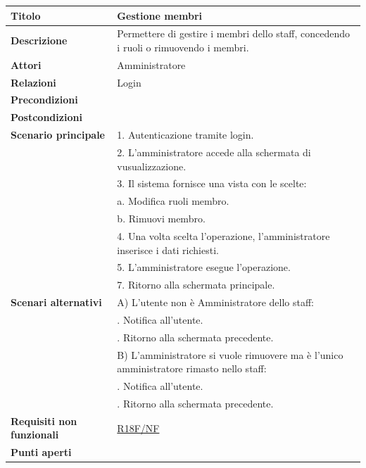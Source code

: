 \documentclass[a4paper]{article}
\begin{document}


  \begin{center}
    \begin{tabularx}{1\textwidth}{l|X}
        \textbf{Titolo} & Gestione membri \\
        \hline
        \textbf{Descrizione} & Permettere di gestire i membri dello staff, concedendo i ruoli o rimuovendo i membri. \\
        \hline
        \textbf{Attori} & Amministratore \\
        \hline
        \textbf{Relazioni} & Login \\
        \hline
        \textbf{Precondizioni} &  \\
        \hline
        \textbf{Postcondizioni} &  \\
        \hline
        \textbf{Scenario principale} & 1. Autenticazione tramite login. \\
                                     & 2. L'amministratore accede alla schermata di vusualizzazione. \\
                                     & 3. Il sistema fornisce una vista con le scelte: \\
                                     & \quad a. Modifica ruoli membro.\\
                                     & \quad b. Rimuovi membro.\\
                                     & 4. Una volta scelta l'operazione, l'amministratore inserisce i dati richiesti. \\
                                     & 5. L'amministratore esegue l'operazione.\\
                                     & 7. Ritorno alla schermata principale.\\
        \hline
        \textbf{Scenari alternativi} & A) L'utente non è Amministratore dello staff: \\
                                     & \quad 1. Notifica all'utente. \\
                                     & \quad 2. Ritorno alla schermata precedente. \\
                                     & B) L'amministratore si vuole rimuovere ma è l'unico amministratore rimasto nello staff: \\
                                     & \quad 1. Notifica all'utente. \\
                                     & \quad 2. Ritorno alla schermata precedente. \\
        \hline
        \textbf{Requisiti non funzionali} & \hyperlink{R18F/NF}{R18F/NF} \\
        \hline
        \textbf{Punti aperti} & \\
        \hline
    \end{tabularx}
  \end{center}
\end{document}
